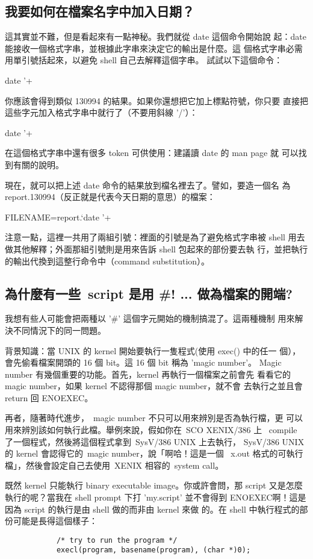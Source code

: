 \documentclass{article}
\begin{document}
\begin{CJK*}{Bg5}{ming}
\subsection{我要如何在檔案名字中加入日期？}

	這其實並不難，但是看起來有一點神秘。我們就從 date 這個命令開始說
	起：date 能接收一個格式字串，並根據此字串來決定它的輸出是什麼。這
	個格式字串必需用單引號括起來，以避免 shell 自己去解釋這個字串。
	試試以下這個命令：

		date '+%

	你應該會得到類似 130994 的結果。如果你還想把它加上標點符號，你只要
	直接把這些字元加入格式字串中就行了（不要用斜線 '/'）：

		date '+%

	在這個格式字串中還有很多 token 可供使用：建議讀 date 的 man page 就
	可以找到有關的說明。

	現在，就可以把上述 date 命令的結果放到檔名裡去了。譬如，要造一個名
	為 report.130994（反正就是代表今天日期的意思）的檔案：

		FILENAME=report.`date '+%

	注意一點，這裡一共用了兩組引號：裡面的引號是為了避免格式字串被 shell 
	用去做其他解釋；外面那組引號則是用來告訴 shell 包起來的部份要去執
	行，並把執行的輸出代換到這整行命令中（command substitution）。

\subsection{為什麼有一些~script 是用 \#! ... 做為檔案的開端?}

	我想有些人可能會把兩種以 '\#' 這個字元開始的機制搞混了。這兩種機制
	用來解決不同情況下的同一問題。

	背景知識：當 UNIX 的 kernel 開始要執行一隻程式(使用 exec() 中的任一
	個），會先偷看檔案開頭的 16 個 bit。這 16 個 bit 稱為 'magic number'。
	Magic number 有幾個重要的功能。首先，kernel 再執行一個檔案之前會先
	看看它的 magic number，如果 kernel 不認得那個 magic number，就不會
	去執行之並且會 return 回 ENOEXEC。

	再者，隨著時代進步，~magic number 不只可以用來辨別是否為執行檔，更
	可以用來辨別該如何執行此檔。舉例來說，假如你在~SCO XENIX/386 上 
	~compile 了一個程式，然後將這個程式拿到~SysV/386 UNIX 上去執行， 
	SysV/386 UNIX 的 kernel 會認得它的~magic number，說「啊哈！這是一個 
	~x.out 格式的可執行檔」，然後會設定自己去使用~XENIX 相容的~system 
	call。

	既然 kernel 只能執行 binary executable image。你或許會問，那 script 
        又是怎麼執行的呢？當我在 shell prompt 下打 'my.script' 並不會得到 
	ENOEXEC啊！這是因為 script 的執行是由 shell 做的而非由 kernel 來做
	的。在 shell 中執行程式的部份可能是長得這個樣子：
\begin{verbatim}
	        /* try to run the program */
	        execl(program, basename(program), (char *)0);


\end{verbatim}
\end{CJK*}
\end{document}
